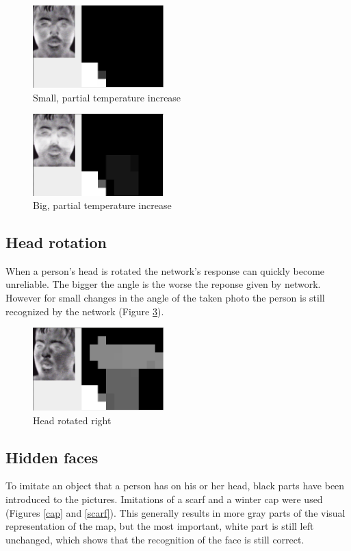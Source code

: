 \documentclass[pdftex]{article}
\begin{document}
\begin{figure}[!htb]
	\centering
	\includegraphics[width=0.45\textwidth]{pictures/part1.png} 
	\caption{Small, partial temperature increase}
	\label{part1}
\end{figure}
\begin{figure}[!htb]
	\centering
	\includegraphics[width=0.45\textwidth]{pictures/part2.png} 
	\caption{Big, partial temperature increase}
	\label{part2}
\end{figure}

\clearpage
\subsection{Head rotation}
When a person's head is rotated the network's response can quickly become unreliable. The bigger the angle is the worse the reponse given by network. However for small changes in the angle of the taken photo the person is still recognized by the network (Figure \ref{rot}).

\begin{figure}[!htb]
	\centering
	\includegraphics[width=0.45\textwidth]{pictures/rot.png} 
	\caption{Head rotated right}
	\label{rot}
\end{figure}

\subsection{Hidden faces}
To imitate an object that a person has on his or her head, black parts have been introduced to the pictures. Imitations of a scarf and a winter cap were used (Figures \ref{cap} and \ref{scarf}). This generally results in more gray parts of the visual representation of the map, but the most important, white part is still left unchanged, which shows that the recognition of the face is still correct. 
\end{document}
